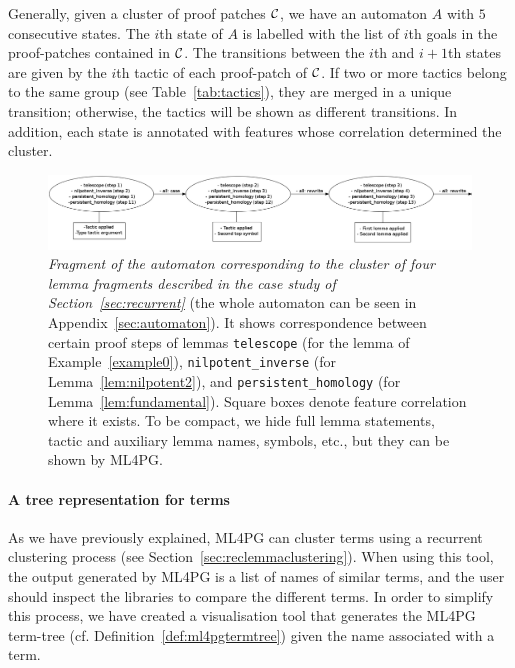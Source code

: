 Generally, given a cluster of proof patches ${\cal C}$, we have an automaton $A$ with $5$ consecutive states. The $i$th state of $A$ is labelled
with the list of $i$th goals in the proof-patches contained in ${\cal C}$. The transitions between the $i$th and $i+1$th states are given by 
the $i$th tactic of each proof-patch of ${\cal C}$. If two or more tactics belong to the same group (see Table~\ref{tab:tactics}),
they are merged in a unique transition; otherwise, the tactics will be shown as different transitions. In addition, each state is annotated with 
features 
whose correlation determined the cluster.

\begin{figure}[t]
\centering 
\includegraphics[scale=.19]{itp6.png}
\caption{\scriptsize{\emph{Fragment of the automaton 
 corresponding to the cluster of four lemma fragments described in the case study of Section~\ref{sec:recurrent}} (the whole automaton can be seen in Appendix~\ref{sec:automaton}). 
It shows correspondence between certain proof steps of lemmas %
\texttt{telescope} (for the lemma of Example~\ref{example0}), \texttt{nilpotent\_inverse} (for Lemma~\ref{lem:nilpotent2}), and \texttt{persistent\_homology} 
(for Lemma~\ref{lem:fundamental}). Square boxes denote feature correlation where it exists. 
To be compact, we  hide full lemma statements, tactic and auxiliary lemma names, symbols, etc., but they can be shown by ML4PG. 
}}\label{fig:automata}
\end{figure}




\paragraph{A tree representation for terms}

As we have previously explained, ML4PG can cluster terms using a recurrent clustering process (see Section~\ref{sec:reclemmaclustering}). When using this tool, the output generated by ML4PG is a list of names of similar terms, and the user should inspect the libraries to compare the different terms. In order to simplify this process, we have created a visualisation tool that generates the ML4PG term-tree (cf. Definition~\ref{def:ml4pgtermtree}) given the name associated with a term.

